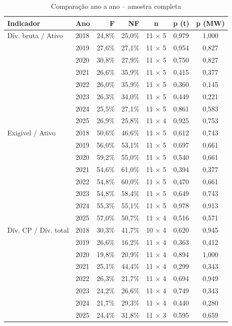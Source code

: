 \begin{table}[htb]
\caption{Comparação ano a ano -- amostra completa}\label{tab:banca-anual-completa}
\centering\footnotesize\setlength{\tabcolsep}{4pt}
\begin{tabular}{llrrccc}
\toprule
Indicador & Ano & F & NF & n & p (t) & p (MW) \\
\midrule
Dív. bruta / Ativo & 2018 & 24,8\% & 25,0\% & 11 $\times$ 5 & 0,979 & 1,000 \\
 & 2019 & 27,6\% & 27,1\% & 11 $\times$ 5 & 0,954 & 0,827 \\
 & 2020 & 30,8\% & 27,9\% & 11 $\times$ 5 & 0,750 & 0,827 \\
 & 2021 & 26,6\% & 35,9\% & 11 $\times$ 5 & 0,415 & 0,377 \\
 & 2022 & 26,0\% & 35,9\% & 11 $\times$ 5 & 0,360 & 0,145 \\
 & 2023 & 26,3\% & 34,0\% & 11 $\times$ 5 & 0,449 & 0,221 \\
 & 2024 & 25,5\% & 27,1\% & 11 $\times$ 5 & 0,861 & 0,583 \\
 & 2025 & 26,9\% & 25,8\% & 11 $\times$ 4 & 0,925 & 0,753 \\
Exigível / Ativo & 2018 & 50,6\% & 46,6\% & 11 $\times$ 5 & 0,612 & 0,743 \\
 & 2019 & 56,0\% & 53,1\% & 11 $\times$ 5 & 0,697 & 0,661 \\
 & 2020 & 59,2\% & 55,0\% & 11 $\times$ 5 & 0,540 & 0,661 \\
 & 2021 & 54,6\% & 61,0\% & 11 $\times$ 5 & 0,394 & 0,377 \\
 & 2022 & 54,8\% & 60,0\% & 11 $\times$ 5 & 0,470 & 0,661 \\
 & 2023 & 54,8\% & 58,4\% & 11 $\times$ 5 & 0,649 & 0,743 \\
 & 2024 & 55,3\% & 55,1\% & 11 $\times$ 5 & 0,978 & 0,913 \\
 & 2025 & 57,0\% & 50,7\% & 11 $\times$ 4 & 0,516 & 0,571 \\
Dív. CP / Dív. total & 2018 & 30,3\% & 41,7\% & 10 $\times$ 4 & 0,620 & 0,945 \\
 & 2019 & 26,6\% & 16,2\% & 11 $\times$ 4 & 0,363 & 0,412 \\
 & 2020 & 19,8\% & 20,9\% & 11 $\times$ 4 & 0,894 & 1,000 \\
 & 2021 & 25,1\% & 44,4\% & 11 $\times$ 4 & 0,299 & 0,343 \\
 & 2022 & 26,3\% & 21,7\% & 11 $\times$ 4 & 0,694 & 0,949 \\
 & 2023 & 24,2\% & 26,6\% & 11 $\times$ 4 & 0,749 & 0,343 \\
 & 2024 & 21,7\% & 29,3\% & 11 $\times$ 4 & 0,440 & 0,280 \\
 & 2025 & 24,4\% & 31,8\% & 11 $\times$ 3 & 0,595 & 0,659 \\
\bottomrule
\end{tabular}
\end{table}
